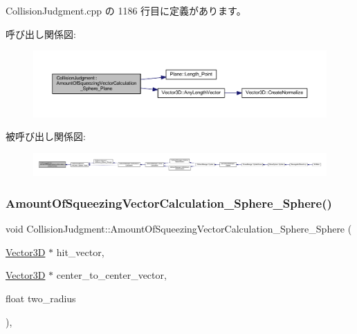  Collision\+Judgment.\+cpp の 1186 行目に定義があります。

呼び出し関係図\+:\nopagebreak
\begin{figure}[H]
\begin{center}
\leavevmode
\includegraphics[width=350pt]{class_collision_judgment_a6d5a391e5cc4bdafff98d04c219f9087_cgraph}
\end{center}
\end{figure}
被呼び出し関係図\+:
\nopagebreak
\begin{figure}[H]
\begin{center}
\leavevmode
\includegraphics[width=350pt]{class_collision_judgment_a6d5a391e5cc4bdafff98d04c219f9087_icgraph}
\end{center}
\end{figure}
\mbox{\label{class_collision_judgment_aeb97af19dd3282bb85eb342c315a1ac3}} 
\subsubsection{\texorpdfstring{Amount\+Of\+Squeezing\+Vector\+Calculation\+\_\+\+Sphere\+\_\+\+Sphere()}{AmountOfSqueezingVectorCalculation\_Sphere\_Sphere()}}
{\footnotesize\ttfamily void Collision\+Judgment\+::\+Amount\+Of\+Squeezing\+Vector\+Calculation\+\_\+\+Sphere\+\_\+\+Sphere (\begin{DoxyParamCaption}\item[{\mbox{\hyperlink{class_vector3_d}{Vector3D}} $\ast$}]{hit\+\_\+vector,  }\item[{\mbox{\hyperlink{class_vector3_d}{Vector3D}} $\ast$}]{center\+\_\+to\+\_\+center\+\_\+vector,  }\item[{float}]{two\+\_\+radius }\end{DoxyParamCaption})\hspace{0.3cm}{\ttfamily [static]}, {\ttfamily [private]}}



